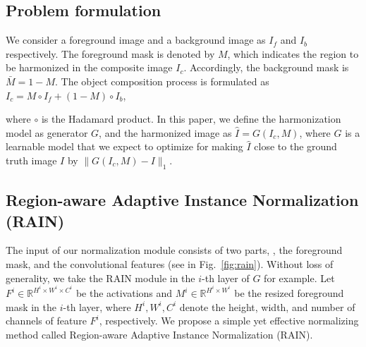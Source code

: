 \documentclass[final]{cvpr}
\begin{document}
\subsection{Problem formulation}
\label{subsec:problem_formulation}
We consider a foreground image and a background image as $I_{f}$ and $I_{b}$ respectively. The foreground mask is denoted by $M$, which indicates the region to be harmonized in the composite image $I_{c}$. Accordingly, the background mask is $\bar{M}=1-M$. The object composition process is formulated as $I_{c} = M\circ I_{f} + (1-M) \circ I_{b}$, 

where $\circ$ is the Hadamard product. In this paper, we define the harmonization model as generator $G$, and the harmonized image as $\hat{I} = G(I_{c}, M)$, where $G$ is a learnable model that we expect to optimize for making $\hat{I}$ close to the ground truth image $I$ by $\|G(I_{c}, M) - I \|_{1}$. 




\subsection{Region-aware Adaptive Instance Normalization (RAIN)}
\label{subsec:RAIN}
The input of our normalization module consists of two parts, \ie, the foreground mask, and the convolutional features (see in Fig.~\ref{fig:rain}). Without loss of generality, we take the RAIN module in the $i$-th layer of $G$ for example. Let $F^{i}\in \mathbb{R}^{H^{i}\times W^{i}\times C^{i}}$ be the activations and $M^{i}\in \mathbb{R}^{H^{i}\times W^{i}}$ be the resized foreground mask in the $i$-th layer, where $H^{i}, W^{i}, C^{i}$ denote the height, width, and number of channels of feature $F^{i}$, respectively. We propose a simple yet effective normalizing method called Region-aware Adaptive Instance Normalization (RAIN). 
\end{document}
